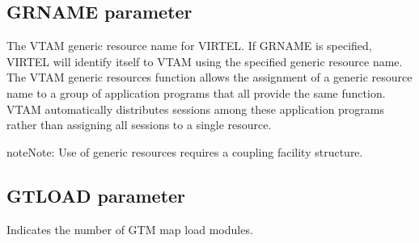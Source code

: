 \documentclass[letterpaper,10pt,english]{sphinxmanual}
\begin{document}
\ignorespaces 

\subsection{GRNAME parameter}
\label{\detokenize{Installation_Guide:grname-parameter}}\label{\detokenize{Installation_Guide:index-69}}
\begin{sphinxVerbatim}[commandchars=\\\{\}]
            
\end{sphinxVerbatim}

\sphinxAtStartPar
{} \sphinxhyphen{} The VTAM generic resource name for VIRTEL. If GRNAME is specified, VIRTEL will identify itself to VTAM using the specified generic resource name. The VTAM generic resources function allows the assignment of a generic resource name to a group of application programs that all provide the same function. VTAM automatically distributes sessions among these application programs rather than assigning all sessions to a single resource.

\begin{sphinxadmonition}{note}{Note:}
\sphinxAtStartPar
Use of generic resources requires a coupling facility structure.
\end{sphinxadmonition}

\ignorespaces 

\subsection{GTLOAD parameter}
\label{\detokenize{Installation_Guide:gtload-parameter}}\label{\detokenize{Installation_Guide:index-70}}
\begin{sphinxVerbatim}[commandchars=\\\{\}]
                
\end{sphinxVerbatim}

\sphinxAtStartPar
{} \sphinxhyphen{} Indicates the number of GTM map load modules.
\end{document}
